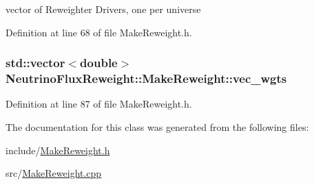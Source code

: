 vector of Reweighter Drivers, one per universe 



Definition at line 68 of file Make\-Reweight.\-h.

\hypertarget{class_neutrino_flux_reweight_1_1_make_reweight_ae164934137effb838289662f0f65c489}{
\subsubsection[{vec\-\_\-wgts}]{\setlength{\rightskip}{0pt plus 5cm}std\-::vector$<$double$>$ Neutrino\-Flux\-Reweight\-::\-Make\-Reweight\-::vec\-\_\-wgts\hspace{0.3cm}{\ttfamily [private]}}}\label{class_neutrino_flux_reweight_1_1_make_reweight_ae164934137effb838289662f0f65c489}


Definition at line 87 of file Make\-Reweight.\-h.



The documentation for this class was generated from the following files\-:\begin{DoxyCompactItemize}
\item 
include/\hyperlink{_make_reweight_8h}{Make\-Reweight.\-h}\item 
src/\hyperlink{_make_reweight_8cpp}{Make\-Reweight.\-cpp}\end{DoxyCompactItemize}
